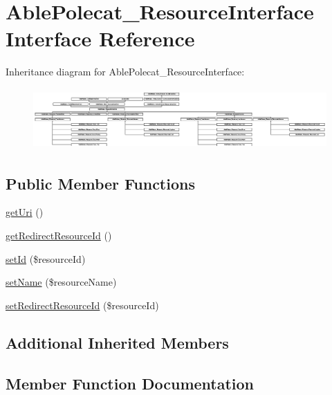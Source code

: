 \hypertarget{interface_able_polecat___resource_interface}{}\section{Able\+Polecat\+\_\+\+Resource\+Interface Interface Reference}
\label{interface_able_polecat___resource_interface}
Inheritance diagram for Able\+Polecat\+\_\+\+Resource\+Interface\+:\begin{figure}[H]
\begin{center}
\leavevmode
\includegraphics[height=2.347561cm]{interface_able_polecat___resource_interface}
\end{center}
\end{figure}
\subsection*{Public Member Functions}
\begin{DoxyCompactItemize}
\item 
\hyperlink{interface_able_polecat___resource_interface_a2ac86cae38fbe15a019d075d485ab702}{get\+Uri} ()
\item 
\hyperlink{interface_able_polecat___resource_interface_abd12d28cbfdd5a45fba85bbac51a0b12}{get\+Redirect\+Resource\+Id} ()
\item 
\hyperlink{interface_able_polecat___resource_interface_aea086c97a20cf305b4a73485fd11763b}{set\+Id} (\$resource\+Id)
\item 
\hyperlink{interface_able_polecat___resource_interface_a396944828c457deecbba6acb9bee6abf}{set\+Name} (\$resource\+Name)
\item 
\hyperlink{interface_able_polecat___resource_interface_a4ff3753741c61381678badc641e09318}{set\+Redirect\+Resource\+Id} (\$resource\+Id)
\end{DoxyCompactItemize}
\subsection*{Additional Inherited Members}


\subsection{Member Function Documentation}
\hypertarget{interface_able_polecat___resource_interface_abd12d28cbfdd5a45fba85bbac51a0b12}{}
